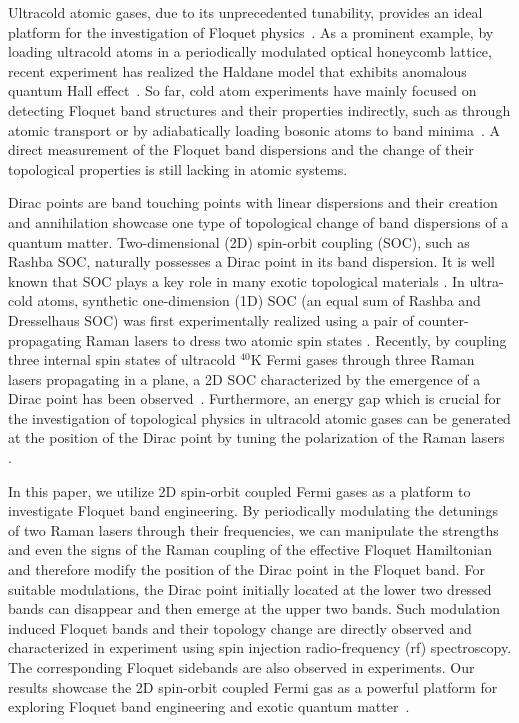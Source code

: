 \documentclass[aps,prl,twocolumn,floatfix,reprint]{revtex4}
\begin{document}
Ultracold atomic gases, due to its unprecedented tunability, provides an
ideal platform for the investigation of Floquet physics~\cite{Eckard2016}.
As a prominent example, by loading ultracold atoms in a periodically
modulated optical honeycomb lattice, recent experiment \cite{Jotzu2014} has
realized the Haldane model that exhibits anomalous quantum Hall effect~\cite%
{Haldane1988}. So far, cold atom experiments have mainly focused on
detecting Floquet band structures and their properties indirectly, such as
through atomic transport \cite{Jotzu2014} or by adiabatically loading
bosonic atoms to band minima~\cite{Parker2013,Spielman2015,Khamehchi2016}. A
direct measurement of the Floquet band dispersions and the change of their
topological properties is still lacking in atomic systems.

Dirac points are band touching points with linear dispersions and their
creation and annihilation showcase one type of topological change of band
dispersions of a quantum matter. Two-dimensional (2D) spin-orbit coupling
(SOC), such as Rashba SOC, naturally possesses a Dirac point in its band
dispersion. It is well known that SOC plays a key role in many exotic
topological materials \cite{Hasan,Qi}. In ultra-cold atoms, synthetic
one-dimension (1D) SOC (an equal sum of Rashba \cite{Rashba} and Dresselhaus
\cite{Dresselhaus55PR} SOC) was first experimentally realized using a pair
of counter-propagating Raman lasers to dress two atomic spin states \cite%
{spielman,FuPRA,Shuai-PRL,Washington-PRA,Purdue,Jing,MIT,Spielman-Fermi,Lev,Jo}%
. Recently, by coupling three internal spin states of ultracold $^{40}$K
Fermi gases through three Raman lasers propagating in a plane, a 2D SOC
characterized by the emergence of a Dirac point has been observed~\cite%
{Huang15}. %
Furthermore, an energy gap which is crucial for the investigation of
topological physics in ultracold atomic gases can be generated at the
position of the Dirac point by tuning the polarization of the Raman lasers
\cite{Meng15}.

In this paper, we utilize 2D spin-orbit coupled Fermi gases as a platform to
investigate Floquet band engineering. By periodically modulating the
detunings of two Raman lasers through their frequencies, we can manipulate
the strengths and even the signs of the Raman coupling of the effective
Floquet Hamiltonian and therefore modify the position of the Dirac point in
the Floquet band. For suitable modulations, the Dirac point initially
located at the lower two dressed bands can disappear and then emerge at the
upper two bands. Such modulation induced Floquet bands and their topology
change are directly observed and characterized in experiment using spin
injection radio-frequency (rf) spectroscopy. The corresponding Floquet
sidebands are also observed in experiments. Our results showcase the 2D
spin-orbit coupled Fermi gas as a powerful platform for exploring Floquet
band engineering and exotic quantum matter~\cite%
{Goldman2014,Eckardt2015,Bukov2015}.
\end{document}
